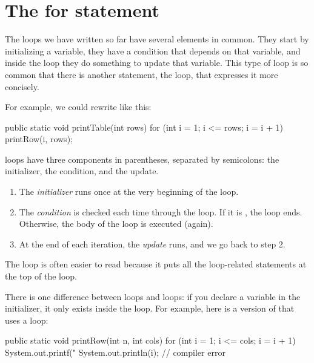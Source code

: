 \section{The for statement}
\label{for}


The loops we have written so far have several elements in common.
They start by initializing a variable, they have a condition that depends on that variable, and inside the loop they do something to update that variable.
This type of loop is so common that there is another statement, the  loop, that expresses it more concisely.

For example, we could rewrite  like this:

\begin{code}
public static void printTable(int rows) {
    for (int i = 1; i <= rows; i = i + 1) {
        printRow(i, rows);
    }
}
\end{code}

 loops have three components in parentheses, separated by semicolons: the initializer, the condition, and the update.

\begin{enumerate}

\item The {\em initializer} runs once at the very beginning of the loop.

\item The {\em condition} is checked each time through the loop.
If it is , the loop ends.
Otherwise, the body of the loop is executed (again).

\item At the end of each iteration, the {\em update} runs, and we go back to step 2.

\end{enumerate}

The  loop is often easier to read because it puts all the loop-related statements at the top of the loop.

There is one difference between  loops and  loops: if you declare a variable in the initializer, it only exists inside the  loop.
For example, here is a version of  that uses a  loop:

\begin{code}
public static void printRow(int n, int cols) {
    for (int i = 1; i <= cols; i = i + 1) {
        System.out.printf("%
    }
    System.out.println(i);  // compiler error
}
\end{code}

